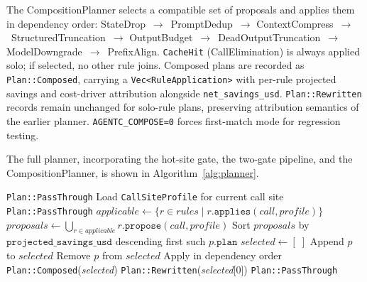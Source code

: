 \documentclass[sigconf,9pt]{acmart}
\begin{document}
The CompositionPlanner selects a compatible set of proposals and applies them in
dependency order: StateDrop~$\rightarrow$~PromptDedup~$\rightarrow$
ContextCompress~$\rightarrow$~StructuredTruncation~$\rightarrow$
OutputBudget~$\rightarrow$~DeadOutputTruncation~$\rightarrow$
ModelDowngrade~$\rightarrow$~PrefixAlign. \texttt{CacheHit} (CallElimination) is
always applied solo; if selected, no other rule joins. Composed plans are recorded as
\texttt{Plan::Composed}, carrying a \texttt{Vec<RuleApplication>} with per-rule
projected savings and cost-driver attribution alongside \texttt{net\_savings\_usd}.
\texttt{Plan::Rewritten} records remain unchanged for solo-rule plans, preserving
attribution semantics of the earlier planner. \texttt{AGENTC\_COMPOSE=0} forces
first-match mode for regression testing.

The full planner, incorporating the hot-site gate, the two-gate pipeline, and the
CompositionPlanner, is shown in Algorithm~\ref{alg:planner}.

\begin{algorithm}
\caption{Agentc planner}
\label{alg:planner}
\begin{algorithmic}[1]
    \State \Return \texttt{Plan::PassThrough}
\EndIf
\State Load \texttt{CallSiteProfile} for current call site
    \State \Return \texttt{Plan::PassThrough} 
\EndIf
\State $\textit{applicable} \leftarrow \{r \in \textit{rules} \mid r.\texttt{applies}(\textit{call}, \textit{profile})\}$
\State $\textit{proposals} \leftarrow \bigcup_{r \in \textit{applicable}} r.\texttt{propose}(\textit{call}, \textit{profile})$
\State Sort $\textit{proposals}$ by $\texttt{projected\_savings\_usd}$ descending
    \State \Return first such $p.\texttt{plan}$ 
\EndIf
\State $\textit{selected} \leftarrow [\;]$
        \State Append $p$ to $\textit{selected}$
    \EndIf
\EndFor
{}
        \State Remove $p$ from $\textit{selected}$
    \EndIf
\EndFor
{}
    \State Apply in dependency order
    \State \Return \texttt{Plan::Composed}(\textit{selected})
    \State \Return \texttt{Plan::Rewritten}(\textit{selected}[0])
\Else
    \State \Return \texttt{Plan::PassThrough}
\EndIf
\end{algorithmic}
\end{algorithm}
\end{document}
